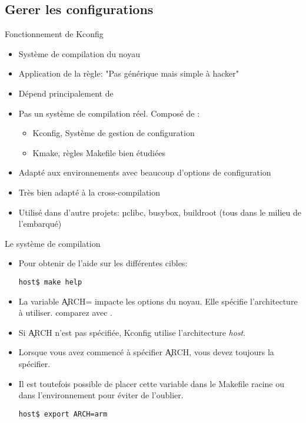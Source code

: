 \subsection{Gerer les configurations}
\begin{frame}[fragile=singleslide]{Fonctionnement de Kconfig}
  \begin{itemize}
  \item Système de compilation du noyau
  \item Application de la règle: "Pas générique mais simple à hacker"
  \item Dépend principalement de 
  \item  Pas un  système de  compilation réel. Composé de :
    \begin{itemize}
    \item Kconfig, Système de gestion de configuration
    \item Kmake, règles Makefile bien étudiées
    \end{itemize}
  \item   Adapté  aux  environnements   avec  beaucoup   d'options  de
    configuration
  \item Très bien adapté à la cross-compilation
  \item Utilisé dans d'autre projets: µclibc, busybox, buildroot (tous
    dans le milieu de l'embarqué)
\end{itemize}
\end{frame} 

\begin{frame}[fragile=singleslide]{Le système de compilation}
\begin{itemize} 
  \item Pour obtenir de l'aide sur les différentes cibles:
    \begin{lstlisting}
host$ make help
    \end{lstlisting} 
  \item  La variable  \c{ARCH=}  impacte les  options  du noyau.  Elle
    spécifie l'architecture à utiliser.  comparez  avec
    . 
  \item   Si   \c{ARCH}   n'est   pas   spécifiée,   Kconfig   utilise
    l'architecture \emph{host}.
  \item Lorsque  vous avez commencé  à spécifier \c{ARCH},  vous devez
    toujours la  spécifier. 
  \item Il  est toutefois  possible de placer  cette variable  dans le
    Makefile racine ou dans l'environnement pour éviter de l'oublier.
    \begin{lstlisting}
host$ export ARCH=arm 
    \end{lstlisting} 
  \end{itemize} 
\end{frame} 

